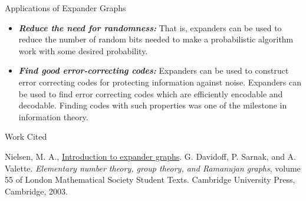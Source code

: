 \documentclass[10pt]{beamer}
\begin{document}
\begin{frame}{Applications of Expander Graphs}
    \begin{itemize}
        \item \textbf{\textit{Reduce the need for randomness:}} That is, expanders can be used to reduce the number of random bits needed to make a probabilistic algorithm work with some desired probability.
        \item \textbf{\textit{Find good error-correcting codes:}} Expanders can be used to construct error correcting codes for protecting information against noise. Expanders can be used to find error correcting codes which are efficiently encodable and decodable. Finding codes with such properties was one of the milestone in information theory.
    \end{itemize}
\end{frame}

\begin{frame}{Work Cited}
    \begin{thebibliography}{3}
         Nielsen, M. A., \href{https://michaelnielsen.org/people/nielsen/blog/archive/notes/expander\_graphs.pdf}{Introduction to expander graphs}.
         G. Davidoff, P. Sarnak, and A. Valette. \textit{Elementary number theory, group theory, and Ramanujan graphs}, volume 55 of London Mathematical Society Student Texts. Cambridge University Press, Cambridge, 2003.
    \end{thebibliography} 
\end{frame}
\end{document}
